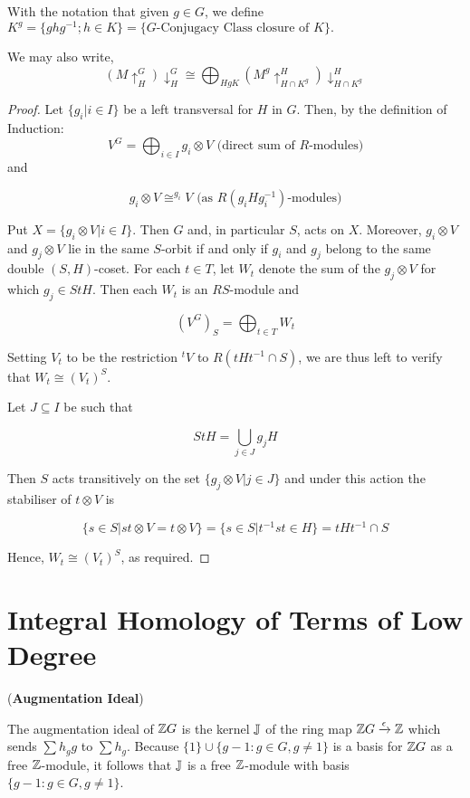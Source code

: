 With the notation that given $g \in G$, we define $K^g = \{ g h g^{-1} ; h \in K \} = \{\text{$G$-Conjugacy Class closure of $K$}\}.$

We may also write,
$$(M\uparrow_{H}^{G})\downarrow^G_H \cong \bigoplus_{HgK} (M^g\uparrow_{H\cap K^g}^H)\downarrow^H_{H\cap K^g}$$  
\begin{proof}

Let $\{g_i \vert i\in I \}$ be a left transversal for $H$ in $G$. Then, by the definition of Induction:
$$V^G = \bigoplus_{i\in I} g_i \otimes V \text{ (direct sum of $R$-modules)}$$
and

$$g_i \otimes V \cong ^{g_i}\!V \text{ (as $R(g_i H g_i^{-1})$-modules)}$$

Put $X = \{g_i \otimes  V \vert i\in I\}$. Then $G$ and, in particular $S$, acts on $X$. Moreover, $g_i \otimes V$ and $g_j\otimes V$ lie in the same $S$-orbit if and only if $g_i$ and $g_j$ belong to the same double $(S,H)$-coset. For each $t\in T$, let $W_t$ denote the sum of the $g_j \otimes V$ for which $g_j \in StH$. Then each $W_t$ is an $RS$-module and 

$$(V^G)_S = \bigoplus_{t\in T} W_t$$

Setting $V_t$ to be the restriction $^tV$ to $R(tHt^{-1} \cap S)$, we are thus left to verify that $W_t \cong (V_t)^S$.

Let $J\subseteq I$ be such that 

$$StH = \bigcup_{j\in J} g_j H$$

Then $S$ acts transitively on the set $\{g_j \otimes V \vert j\in J \}$ and under this action the stabiliser of $t\otimes V$ is 

$$\{s\in S \vert st \otimes V = t\otimes V \} = \{s \in S \vert t^{-1} s t \in H \} = tHt^{-1} \cap S$$

Hence, $W_t \cong (V_t)^S$, as required.
\end{proof}

\section{Integral Homology of Terms of Low Degree\label{lowdeggroup}}
\begin{definition}(\textbf{Augmentation Ideal})

The augmentation ideal of $\mathbb Z G$ is the kernel $\mathbb J$ of the ring map $\mathbb Z G \xrightarrow{\epsilon} \mathbb Z$ which sends $\sum h_g g$ to $\sum h_g$. Because $\{1\} \cup \{ g-1 : g\in G, g\neq 1 \} $ is a basis for $\mathbb Z G$ as a free $\mathbb Z$-module, it follows that $\mathbb J$ is a free $\mathbb Z$-module with basis $\{g-1 : g\in G, g\neq 1\}$.

\end{definition}

